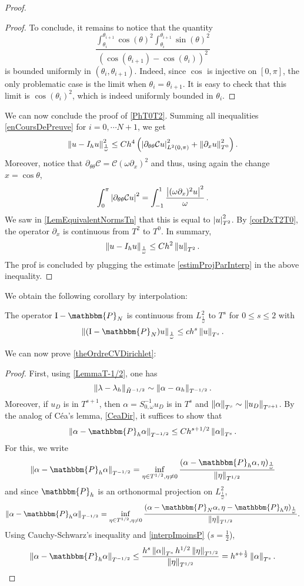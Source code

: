 \documentclass[a4paper]{article}
\begin{document}
\begin{proof}
\begin{proof}
		To conclude, it remains to notice that the quantity
		\[\frac{ \int_{\theta_i}^{\theta_{i+1}} \cos(\theta)^2\int_{\theta_i}^{\theta_{i+1}} \sin(\theta)^2}{(\cos(\theta_{i+1}) - \cos(\theta_i))^2}\]
		is bounded uniformly in $(\theta_i, \theta_{i+1})$. Indeed, since $\cos$ is injective on $[0,\pi]$, the only problematic case is the limit when $\theta_i = \theta_{i+1}$. It is easy to check that this limit is $\cos(\theta_i)^2$, which is indeed uniformly bounded in $\theta_i$. 	
	\end{proof}
	\noindent We can now conclude the proof of \autoref{PhT0T2}. Summing all inequalities \eqref{enCoursDePreuve} for $i = 0, \cdots N+1$, we get 
	\[\left\|u - I_h u\right\|_{\frac{1}{\omega}}^2 \leq Ch^4 \left( \left\lvert \partial_{\theta\theta}\mathcal{C}u \right\rvert_{L^2(0,\pi)}^2 + \left\|\partial_x u\right\|_{T^0}^2\right).\]
	Moreover, notice that $\partial_{\theta\theta}\mathcal{C}  = \mathcal{C}(\omega \partial_x)^2 $ and thus, using again the change $x = \cos\theta$,
	\[\int_{0}^{\pi}\left\lvert \partial_{\theta\theta}\mathcal{C}u \right\rvert^2 = \int_{-1}^{1} \frac{\left\lvert (\omega \partial_x)^2 u \right\rvert^2}{\omega}\,.\]
	We saw in \autoref{LemEquivalentNormsTn} that this is equal to $\left\lvert u \right\rvert_{T^2}^2$. By \autoref{corDxT2T0}, the operator $\partial_x$ is continuous from $T^2$ to $T^0$. In summary, 
	\[\left\|u - I_hu\right\|_{\frac{1}{\omega}} \leq Ch^2 \left\|u\right\|_{T^2}.\]
	The prof is concluded by plugging the estimate \eqref{estimProjParInterp} in the above inequality. 
\end{proof}
\noindent We obtain the following corollary by interpolation:
\begin{Cor}
	\label{interpImoinsP}
	The operator $\textup{I} - \mathbbm{P}_N$ is continuous from $L^2_\frac{1}{\omega}$ to $T^s$ for $0 \leq s \leq 2$ with
	\[\norm{(\textup{I} - \mathbbm{P}_N)u}_{\frac{1}{\omega}} \leq c h^s \norm{u}_{T^s}.\]
\end{Cor}
\noindent We can now prove \autoref{theOrdreCVDirichlet}:
\begin{proof}
	First, using \autoref{LemmaT-1/2}, one has 
	\[\left\|\lambda - \lambda_h\right\|_{\tilde{H}^{-1/2}} \sim \left\|\alpha - \alpha_h\right\|_{T^{-1/2}}.\]
	Moreover, if $u_D$ is in $T^{s+1}$, then $\alpha = S_{0,\omega}^{-1} u_D$ is in $T^s$ and $\left\|\alpha\right\|_{T^s} \sim \left\|u_D\right\|_{T^{s+1}}$. 	
	By the analog of Céa's lemma, \autoref{CeaDir}, it suffices to show that 
	\[ \norm{\alpha - \mathbbm{P}_h \alpha}_{T^{-1/2}} \leq C h^{s + 1/2} \norm{\alpha}_{T^s}.\]
	For this, we write
	\[\norm{\alpha - \mathbbm{P}_h \alpha}_{T^{-1/2}} = \inf_{\eta \in T^{1/2}, \eta \neq 0} \dfrac{(\alpha - \mathbbm{P}_h \alpha,\eta)_{\frac{1}{\omega}}}{\norm{\eta}_{T^{1/2}}}\]
	and since $\mathbbm{P}_h$ is an orthonormal projection on $L^2_\frac{1}{\omega}$, 
	\[\norm{\alpha - \mathbbm{P}_h \alpha}_{T^{-1/2}} = \inf_{\eta \in T^{1/2}, \eta \neq 0} \dfrac{(\alpha - \mathbbm{P}_N \alpha,\eta -\mathbbm{P}_h \eta )_{\frac{1}{\omega}}}{\norm{\eta}_{T^{1/2}}}.\]
	Using Cauchy-Schwarz's inequality and \autoref{interpImoinsP} ($s = \frac{1}{2}$), 
	\[\norm{\alpha - \mathbbm{P}_h \alpha}_{T^{-1/2}} \leq \dfrac{h^s \norm{\alpha}_{T^s} h^{1/2}\norm{\eta}_{T^{1/2}}}{\norm{\eta}_{T^{1/2}}} = h^{s+\frac{1}{2}} \norm{\alpha}_{T^s}.\]
\end{proof}
\end{document}
